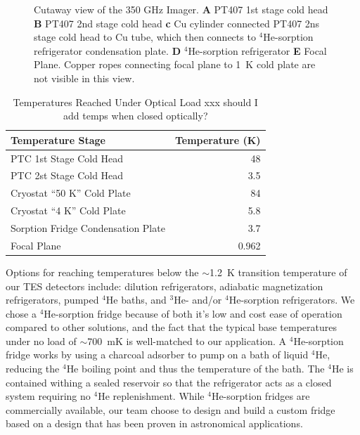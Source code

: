 \documentclass[10pt,twocolumn,article]{memoir}
\newcommand*{\TES}{{\small TES}\xspace}
\newcommand*{\He}[1]{$^{#1}$He\xspace}
\begin{document}
\begin{figure}[t]
\caption{Cutaway view of the 350 GHz Imager. \textbf{A} PT407 1st stage cold head \textbf{B} PT407 2nd stage cold head \textbf{c} Cu cylinder connected PT407 2ns stage cold head to Cu tube, which then connects to \He4-sorption refrigerator condensation plate. \textbf{D} \He4-sorption refrigerator \textbf{E} Focal Plane. Copper ropes connecting focal plane to 1~K cold plate are not visible in this view.}
\label{fig:cryo-cutaway}
\end{figure}

\begin{table}[t]
\centering
\caption{Temperatures Reached Under Optical Load xxx should I add temps when closed optically?}
\label{tab:temp-optical-load}
\begin{tabular}{l r}
\toprule
Temperature Stage &  Temperature (K)\\
\midrule
PTC 1st Stage Cold Head 			& 48 \\
PTC 2st Stage Cold Head 			& 3.5 \\
Cryostat ``50 K'' Cold Plate 		& 84 \\
Cryostat ``4 K'' Cold Plate 			& 5.8 \\
Sorption Fridge Condensation Plate 	& 3.7 \\
Focal Plane 						& 0.962 \\
\bottomrule
\end{tabular}
\end{table}

Options for reaching temperatures below the $\sim$1.2~K transition temperature of our \TES detectors include: dilution refrigerators, adiabatic magnetization refrigerators, pumped \He4 baths, and \He3- and/or \He4-sorption refrigerators.
We chose a \He4-sorption fridge because of both it's low and cost ease of operation compared to other solutions, and the fact that the typical base temperatures under no load of $\sim$700~mK is well-matched to our application.
A  \He4-sorption fridge works by using a charcoal adsorber to pump on a bath of liquid \He4, reducing the \He4 boiling point and thus the temperature of the bath.
The \He4 is contained withing a sealed reservoir so that the refrigerator acts as a closed system requiring no \He4 replenishment. 
While \He4-sorption fridges are commercially available, our team choose to design and build a custom fridge based on a design that has been proven in astronomical applications\cite{devlin2004high}.
\end{document}
